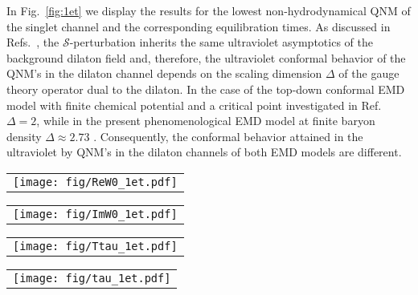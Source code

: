 \documentclass[aps,prd,showkeys,superscriptaddress,singlecolumn,nofootinbib,floatfix]{revtex4-1}
\begin{document}
In Fig.\ \ref{fig:1et} we display the results for the lowest non-hydrodynamical QNM of the singlet channel and the corresponding equilibration times. As discussed in Refs.\ \cite{DeWolfe:2011ts,Janik:2016btb,Critelli:2017euk}, the $\mathcal{S}$-perturbation inherits the same ultraviolet asymptotics of the background dilaton field and, therefore, the ultraviolet conformal behavior of the QNM's in the dilaton channel depends on the scaling dimension $\Delta$ of the gauge theory operator dual to the dilaton. In the case of the top-down conformal EMD model with finite chemical potential and a critical point investigated in Ref.\ \cite{Critelli:2017euk} $\Delta = 2$, while in the present phenomenological EMD model at finite baryon density $\Delta\approx 2.73$ \cite{Critelli:2017oub}. Consequently, the conformal behavior attained in the ultraviolet by QNM's in the dilaton channels of both EMD models are different.

\begin{figure*}
\begin{center}
\begin{tabular}{c}
\texttt{[image: fig/ReW0\_1et.pdf]} %
\end{tabular}
\begin{tabular}{c}
\texttt{[image: fig/ImW0\_1et.pdf]} %
\end{tabular}
\begin{tabular}{c}
\texttt{[image: fig/Ttau\_1et.pdf]} %
\end{tabular}
\begin{tabular}{c}
\texttt{[image: fig/tau\_1et.pdf]} %
\end{tabular}
\end{center}
\caption{{\small (Color online) Absolute value of the real part of the lowest QNM in the $SO(3)$ singlet channel (top left), imaginary part of the lowest QNM (top right), the dimensionless combination given by the temperature times the equilibration time (bottom left), and the equilibration time measured in units of fm/c (bottom right) as functions of temperature for different values of the baryon chemical potential. In the upper panels we plot both the calculated points and the interpolated curves between them.}
\label{fig:1et}}
\end{figure*}
\end{document}

